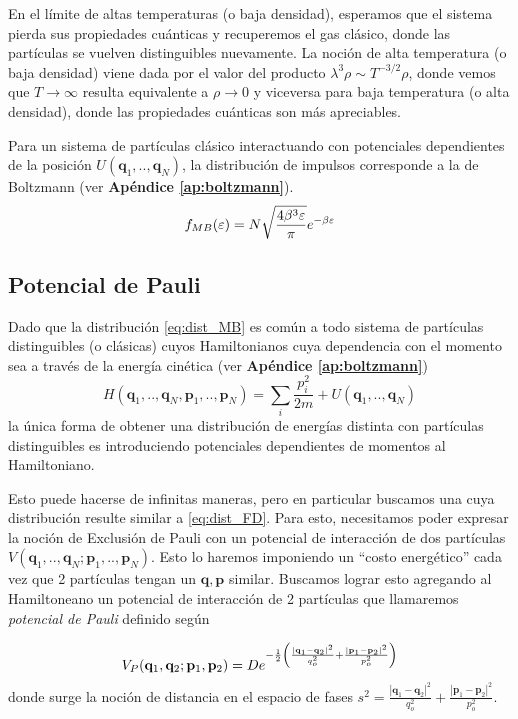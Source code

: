 En el límite de altas temperaturas (o baja densidad), esperamos que el sistema pierda sus propiedades cuánticas y recuperemos el gas clásico, donde las partículas
se vuelven distinguibles nuevamente. 
La noción de alta temperatura (o baja densidad) viene dada por el valor del producto $\lambda^3\rho \sim T^{-3/2}\rho$, donde vemos que $T\to\infty$ resulta equivalente a $\rho\to0$ 
y viceversa para baja temperatura (o alta densidad), donde las propiedades cuánticas son más apreciables.

Para un sistema de partículas clásico interactuando con potenciales dependientes de la posición $U(\mathbf{q}_1,..,\mathbf{q}_N)$, la distribución de impulsos 
corresponde a la de Boltzmann (ver \textbf{Apéndice \ref{ap:boltzmann}}).
\begin{equation}{\label{eq:dist_MB}}
 f_{MB}(\varepsilon) = N\sqrt{\frac{4\beta^3\varepsilon}{\pi}}e^{-\beta\varepsilon}
\end{equation}


\subsection{Potencial de Pauli}

Dado que la distribución \eqref{eq:dist_MB} es común a todo sistema de partículas distinguibles (o clásicas) cuyos Hamiltonianos cuya dependencia con el momento 
sea a través de la energía cinética (ver  \textbf{Apéndice \ref{ap:boltzmann}})
\[ H(\mathbf{q}_1,..,\mathbf{q}_N,\mathbf{p}_1,..,\mathbf{p}_N) = \sum_i \frac{p_i^2}{2m} + U(\mathbf{q}_1,..,\mathbf{q}_N)\]
la única forma de obtener una distribución de energías distinta con partículas distinguibles es introduciendo potenciales dependientes de momentos al Hamiltoniano. 

Esto puede hacerse de infinitas maneras, pero en particular buscamos una cuya distribución resulte similar a \eqref{eq:dist_FD}.
Para esto, necesitamos poder expresar la noción de Exclusión de Pauli con un potencial de interacción de dos partículas $V(\mathbf{q}_1,..,\mathbf{q}_N;\mathbf{p}_1,..,\mathbf{p}_N)$.
Esto lo haremos imponiendo un ``costo energético'' cada vez que 2 partículas tengan un $\mathbf{q}, \mathbf{p}$ similar. 
Buscamos lograr esto agregando al Hamiltoneano un potencial de interacción de 2 partículas que llamaremos \textit{potencial de Pauli} definido según

\begin{equation}{\label{eq:def_int_pauli}}
 V_P(\mathbf{q}_1,\mathbf{q}_2;\mathbf{p}_1,\mathbf{p}_2) = De^{-\frac{1}{2}\left( \frac{|\mathbf{q}_1-\mathbf{q}_2|^2}{q_o^2} +\frac{|\mathbf{p}_1-\mathbf{p}_2|^2}{p_o^2} \right)}
\end{equation}
donde surge la noción de distancia en el espacio de fases $s^2 = \frac{|\mathbf{q}_1-\mathbf{q}_2|^2}{q_o^2} +\frac{|\mathbf{p}_1-\mathbf{p}_2|^2}{p_o^2}$. 

